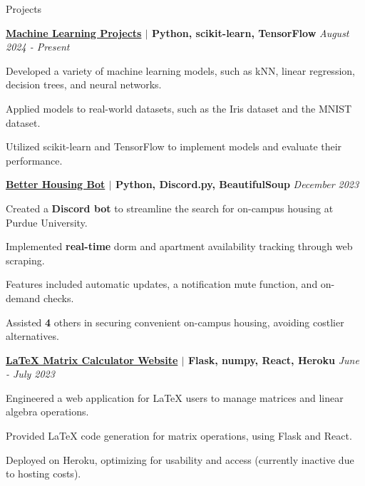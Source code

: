 \documentclass[
    11pt, %
]{resume} %
\begin{document}
\begin{rSection}{Projects}
\vspace*{-0.3cm}
\begin{rSubsection}{}{}{\bf \href{}{Machine Learning Projects} $\mid$ Python, scikit-learn, TensorFlow }{\hfill \em August 2024 - Present}
    \item Developed a variety of machine learning models, such as kNN, linear regression, decision trees, and neural networks.
    \item Applied models to real-world datasets, such as the Iris dataset and the MNIST dataset.
    \item Utilized scikit-learn and TensorFlow to implement models and evaluate their performance.
\end{rSubsection}
\begin{rSubsection}{}{}{\bf \href{https://github.com/maxinimus/better-housing-bot}{Better Housing Bot} $\mid$ Python, Discord.py, BeautifulSoup }{\hfill \em December 2023}
    \item Created a \textbf{Discord bot} to streamline the search for on-campus housing at Purdue University.
    \item Implemented \textbf{real-time} dorm and apartment availability tracking through web scraping.
    \item Features included automatic updates, a notification mute function, and on-demand checks.
    \item Assisted \textbf{4} others in securing convenient on-campus housing, avoiding costlier alternatives.
\end{rSubsection}
\begin{rSubsection}{}{}{\bf \href{https://github.com/maxinimus/LaTeX-Matrix-Calculator}{LaTeX Matrix Calculator Website} $\mid$ Flask, numpy, React, Heroku }{ \hfill \em June - July 2023}
    \item Engineered a web application for LaTeX users to manage matrices and linear algebra operations.
    \item Provided LaTeX code generation for matrix operations, using Flask and React.
    \item Deployed on Heroku, optimizing for usability and access (currently inactive due to hosting costs).
\end{rSubsection}

\end{rSection}
\vspace*{-0.3cm}
\end{document}
